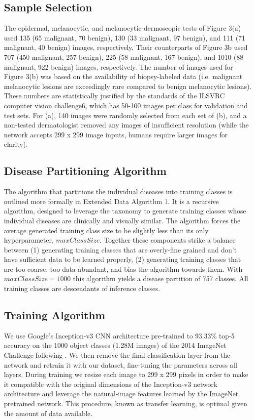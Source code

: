 \subsection{Sample Selection}
The epidermal, melanocytic, and melanocytic-dermoscopic tests of Figure 3(a) used 135 (65 malignant, 70 benign), 130 (33 malignant, 97 benign), and 111 (71 malignant, 40 benign) images, respectively. Their counterparts of Figure 3b used 707 (450 malignant, 257 benign), 225 (58 malignant, 167 benign), and 1010 (88 malignant, 922 benign) images, respectively. The number of images used for Figure 3(b) was based on the availability of biopsy-labeled data (i.e. malignant melanocytic lesions are exceedingly rare compared to benign melanocytic lesions). These numbers are statistically justified by the standards of the ILSVRC computer vision challenge6, which has 50-100 images per class for validation and test sets. For (a), 140 images were randomly selected from each set of (b), and a non-tested dermatologist removed any images of insufficient resolution (while the network accepts 299 x 299 image inputs, humans require larger images for clarity). 

\subsection{Disease Partitioning Algorithm}
The algorithm that partitions the individual diseases into training classes is outlined more formally in Extended Data Algorithm 1. It is a recursive algorithm, designed to leverage the taxonomy to generate training classes whose individual diseases are clinically and visually similar. The algorithm forces the average generated training class size to be slightly less than its only hyperparameter, $maxClassSize$. Together these components strike a balance between (1) generating training classes that are overly-fine grained and don’t have sufficient data to be learned properly, (2) generating training classes that are too coarse, too data abundant, and bias the algorithm towards them. With $maxClassSize = 1000$ this algorithm yields a disease partition of 757 classes. All training classes are descendants of inference classes.

\subsection{Training Algorithm}
We use Google’s Inception-v3 CNN architecture pre-trained to 93.33\% top-5 accuracy on the 1000 object classes (1.28M images) of the 2014 ImageNet Challenge following \cite{szegedy2016rethinking}. We then remove the final classification layer from the network and retrain it with our dataset, fine-tuning the parameters across all layers. During training we resize each image to 299 x 299 pixels in order to make it compatible with the original dimensions of the Inception-v3 network architecture and leverage the natural-image features learned by the ImageNet pretrained network. This procedure, known as transfer learning, is optimal given the amount of data available.

